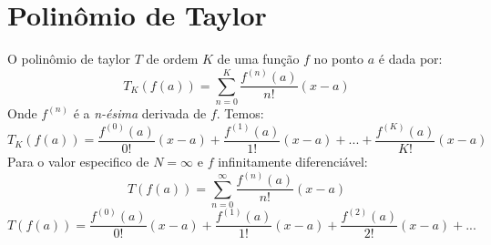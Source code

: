 \section{Polinômio de Taylor}
O polinômio de taylor \(T\) de ordem \(K\) de uma função \(f\) no ponto \(a\) é dada por:
\begin{equation}
    T_K(f(a)) = \sum_{n=0}^{K} \frac{f^{(n)}(a)}{n!}(x - a)
\end{equation}
Onde \(f^{(n)}\) é a \textit{n-ésima} derivada de \(f\). Temos:
\begin{equation}
    T_K(f(a)) = \frac{f^{(0)}(a)}{0!}(x - a) +
           \frac{f^{(1)}(a)}{1!}(x - a) + ... +
           \frac{f^{(K)}(a)}{K!}(x - a)
\end{equation}
Para o valor especifico de \(N= \infty\) e \(f\) infinitamente diferenciável:
\begin{equation}
    T(f(a)) = \sum_{n=0}^{\infty} \frac{f^{(n)}(a)}{n!}(x - a)
\end{equation}
\begin{equation}
    T(f(a)) = \frac{f^{(0)}(a)}{0!}(x - a) +
           \frac{f^{(1)}(a)}{1!}(x - a) +
           \frac{f^{(2)}(a)}{2!}(x - a) + ...
\end{equation}
